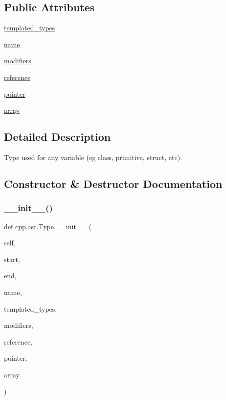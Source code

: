 \subsection*{Public Attributes}
\begin{DoxyCompactItemize}
\item 
\mbox{\hyperlink{classcpp_1_1ast_1_1Type_a7c38fcafa00dae6ee22bab783086a1a7}{templated\+\_\+types}}
\item 
\mbox{\hyperlink{classcpp_1_1ast_1_1Type_a5905424e2b65f0215b6ecd73b4bfe24c}{name}}
\item 
\mbox{\hyperlink{classcpp_1_1ast_1_1Type_a0effa0a077eda79943e881955b4c51a5}{modifiers}}
\item 
\mbox{\hyperlink{classcpp_1_1ast_1_1Type_a8d2cddd631397c3bf86198cc420d584d}{reference}}
\item 
\mbox{\hyperlink{classcpp_1_1ast_1_1Type_a37234bb68915c93894cbc8e366c1eaad}{pointer}}
\item 
\mbox{\hyperlink{classcpp_1_1ast_1_1Type_a1fd0493e82da315bcb4c02b0cf2133a3}{array}}
\end{DoxyCompactItemize}


\subsection{Detailed Description}
\begin{DoxyVerb}Type used for any variable (eg class, primitive, struct, etc).\end{DoxyVerb}
 

\subsection{Constructor \& Destructor Documentation}
\mbox{\label{classcpp_1_1ast_1_1Type_adc20d88db721b5d7b513c08a4d6753c9}} 
\subsubsection{\texorpdfstring{\_\_init\_\_()}{\_\_init\_\_()}}
{\footnotesize\ttfamily def cpp.\+ast.\+Type.\+\_\+\+\_\+init\+\_\+\+\_\+ (\begin{DoxyParamCaption}\item[{}]{self,  }\item[{}]{start,  }\item[{}]{end,  }\item[{}]{name,  }\item[{}]{templated\+\_\+types,  }\item[{}]{modifiers,  }\item[{}]{reference,  }\item[{}]{pointer,  }\item[{}]{array }\end{DoxyParamCaption})}

